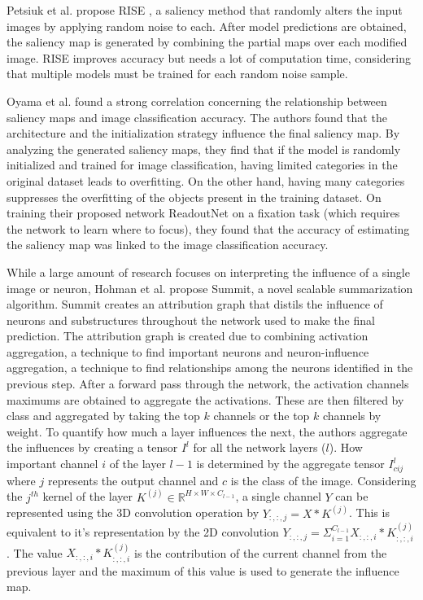 Petsiuk et al. propose RISE \cite{petsiukRISERandomizedInput2018}, a saliency method that randomly alters the input images by applying random noise to each. After model predictions are obtained, the saliency map is generated by combining the partial maps over each modified image. RISE improves accuracy but needs a lot of computation time, considering that multiple models must be trained for each random noise sample.

Oyama et al. \cite{oyamaInfluenceImageClassification2018} found a strong correlation concerning the relationship between saliency maps and image classification accuracy. The authors found that the architecture and the initialization strategy influence the final saliency map. By analyzing the generated saliency maps, they find that if the model is randomly initialized and trained for image classification, having limited categories in the original dataset leads to overfitting. On the other hand, having many categories suppresses the overfitting of the objects present in the training dataset. On training their proposed network ReadoutNet on a fixation task (which requires the network to learn where to focus), they found that the accuracy of estimating the saliency map was linked to the image classification accuracy.

While a large amount of research focuses on interpreting the influence of a single image or neuron, Hohman et al. propose Summit, \cite{hohmanSummitScalingDeep2019} a novel scalable summarization algorithm. Summit creates an attribution graph that distils the influence of neurons and substructures throughout the network used to make the final prediction. The attribution graph is created due to combining activation aggregation, a technique to find important neurons and neuron-influence aggregation, a technique to find relationships among the neurons identified in the previous step. After a forward pass through the network, the activation channels maximums are obtained to aggregate the activations. These are then filtered by class and aggregated by taking the top $k$ channels or the top $k$ channels by weight. To quantify how much a layer influences the next, the authors aggregate the influences by creating a tensor $I^{l}$ for all the network layers ($l$). How important channel $i$ of the layer $l-1$ is determined by the aggregate tensor $I^{l}_{cij}$ where $j$ represents the output channel and $c$ is the class of the image. Considering the $j^{th}$ kernel of the layer $K^{(j)} \in \mathbb{R}^{H \times W \times C_{l-1}}$, a single channel $Y$ can be represented using the 3D convolution operation by $Y_{:,:,j}= X \ast K^{(j)}$. This is equivalent to it's representation by the 2D convolution $Y_{:,:,j}= \Sigma_{i=1}^{C_{l-1}} X_{:,:,i} \ast K^{(j)}_{:,:,i}$. The value $X_{:,:,i} \ast K^{(j)}_{:,:,i}$ is the contribution of the current channel from the previous layer and the maximum of this value is used to generate the influence map.

